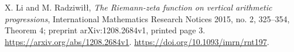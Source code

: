 X. Li and M. Radziwi\l\l,
\emph{The Riemann-zeta function on vertical arithmetic progressions},
International Mathematics Research Notices 2015, no. 2, 325--354,
Theorem 4; preprint arXiv:1208.2684v1, printed page 3.
\url{https://arxiv.org/abs/1208.2684v1}.
\url{https://doi.org/10.1093/imrn/rnt197}.
